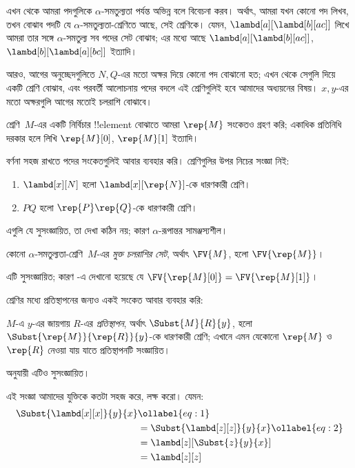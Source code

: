 \documentclass[../../../include/open-logic-section]{subfiles}
\begin{document}

এখন থেকে আমরা পদগুলিকে $\alpha$-সমতুল্যতা পর্যন্ত অভিন্ন বলে বিবেচনা
করব। অর্থাৎ, আমরা যখন কোনো পদ লিখব, তখন বোঝাব পদটি যে
$\alpha$-সমতুল্যতা-শ্রেণিতে আছে, সেই শ্রেণিকে। যেমন,
$\lambd[a][\lambd[b][a c]]$ লিখে আমরা তার সঙ্গে $\alpha$-সমতুল্য সব
পদের সেট বোঝাব; এর মধ্যে আছে $\lambd[a][\lambd[b][a c]]$,
$\lambd[b][\lambd[a][b c]]$ ইত্যাদি।

আরও, আগের অনুচ্ছেদগুলিতে $N, Q$-এর মতো অক্ষর দিয়ে কোনো পদ বোঝানো
হত; এখন থেকে সেগুলি দিয়ে একটি শ্রেণি বোঝাব, এবং পরবর্তী আলোচনায়
পদের বদলে এই শ্রেণিগুলিই হবে আমাদের অধ্যয়নের বিষয়। $x, y$-এর মতো
অক্ষরগুলি আগের মতোই চলরাশি বোঝাবে।

শ্রেণি~$M$-এর একটি নির্বিচার !!{element} বোঝাতে আমরা $\rep{M}$ সংকেতও
গ্রহণ করি; একাধিক প্রতিনিধি দরকার হলে লিখি $\rep{M}[0]$,
$\rep{M}[1]$ ইত্যাদি।

বর্ণনা সহজ রাখতে পদের সংকেতগুলিই আবার ব্যবহার করি। শ্রেণিগুলির উপর
নিচের সংজ্ঞা নিই:
\begin{defn}
  \begin{enumerate}
  \item $\lambd[x][N]$ হলো $\lambd[x][\rep{N}]$-কে ধারণকারী শ্রেণি।
  \item $PQ$ হলো $\rep{P}\rep{Q}$-কে ধারণকারী শ্রেণি।
  \end{enumerate}
\end{defn}

এগুলি যে সুসংজ্ঞায়িত, তা দেখা কঠিন নয়; কারণ $\alpha$-রূপান্তর
সামঞ্জস্যশীল।

\begin{defn} 
  কোনো $\alpha$-সমতুল্যতা-শ্রেণি~$M$-এর \emph{মুক্ত চলরাশির সেট},
  অর্থাৎ $\FV{M}$, হলো $\FV{\rep{M}}$।
\end{defn}

এটি সুসংজ্ঞায়িত; কারণ -এ দেখানো হয়েছে যে
$\FV{\rep{M}[0]} = \FV{\rep{M}[1]}$।

শ্রেণির মধ্যে প্রতিস্থাপনের জন্যও একই সংকেত আবার ব্যবহার করি:
\begin{defn} 
  $M$-এ $y$-এর জায়গায় $R$-এর \emph{প্রতিস্থাপন}, অর্থাৎ
  $\Subst{M}{R}{y}$, হলো $\Subst{\rep{M}}{\rep{R}}{y}$-কে ধারণকারী
  শ্রেণি; এখানে এমন যেকোনো $\rep{M}$ ও~$\rep{R}$ নেওয়া যায় যাতে
  প্রতিস্থাপনটি সংজ্ঞায়িত।
\end{defn}

 অনুযায়ী এটিও সুসংজ্ঞায়িত।

এই সংজ্ঞা আমাদের যুক্তিকে কতটা সহজ করে, লক্ষ করো। যেমন:
\begin{align}
  \Subst{\lambd[x][x]}{y}{x} & \ollabel{eq:1}\\
  &= \Subst{\lambd[z][z]}{y}{x} \ollabel{eq:2}\\
  &= \lambd[z][\Subst{z}{y}{x}] \\
  &= \lambd[z][z]
\end{align}
\end{document}
